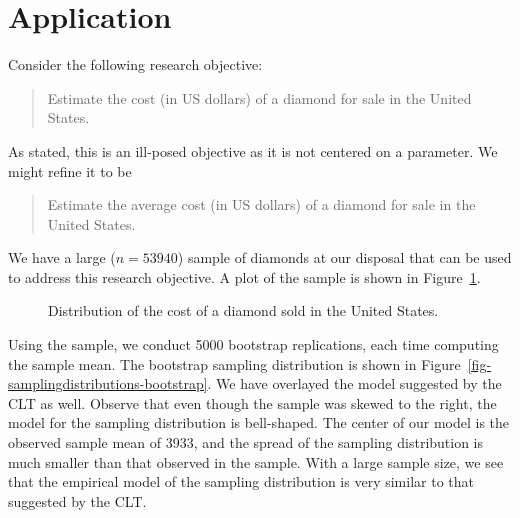 \documentclass[
  letterpaper,
  DIV=11,
  numbers=noendperiod]{scrreprt}
\theoremstyle{definition}
\theoremstyle{plain}
\theoremstyle{definition}
\theoremstyle{remark}
\begin{document}
\section{Application}\label{application}

Consider the following research objective:

\begin{quote}
Estimate the cost (in US dollars) of a diamond for sale in the United
States.
\end{quote}

As stated, this is an ill-posed objective as it is not centered on a
parameter. We might refine it to be

\begin{quote}
Estimate the average cost (in US dollars) of a diamond for sale in the
United States.
\end{quote}

We have a large (\(n = 53940\)) sample of diamonds at our disposal that
can be used to address this research objective. A plot of the sample is
shown in Figure~\ref{fig-samplingdistributions-sample}.

\begin{figure}


\caption{\label{fig-samplingdistributions-sample}Distribution of the
cost of a diamond sold in the United States.}

\end{figure}%

Using the sample, we conduct 5000 bootstrap replications, each time
computing the sample mean. The bootstrap sampling distribution is shown
in Figure~\ref{fig-samplingdistributions-bootstrap}. We have overlayed
the model suggested by the CLT as well. Observe that even though the
sample was skewed to the right, the model for the sampling distribution
is bell-shaped. The center of our model is the observed sample mean of
3933, and the spread of the sampling distribution is much smaller than
that observed in the sample. With a large sample size, we see that the
empirical model of the sampling distribution is very similar to that
suggested by the CLT.
\end{document}

